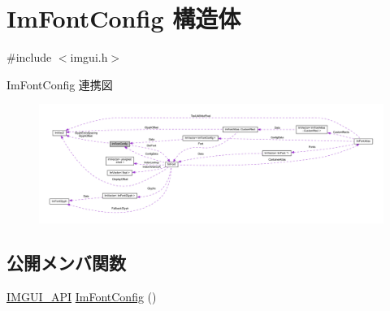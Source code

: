 \hypertarget{struct_im_font_config}{}\section{Im\+Font\+Config 構造体}
\label{struct_im_font_config}


{\ttfamily \#include $<$imgui.\+h$>$}



Im\+Font\+Config 連携図\nopagebreak
\begin{figure}[H]
\begin{center}
\leavevmode
\includegraphics[width=350pt]{struct_im_font_config__coll__graph}
\end{center}
\end{figure}
\subsection*{公開メンバ関数}
\begin{DoxyCompactItemize}
\item 
\mbox{\hyperlink{imgui_8h_a43829975e84e45d1149597467a14bbf5}{I\+M\+G\+U\+I\+\_\+\+A\+PI}} \mbox{\hyperlink{struct_im_font_config_af56ce39ce94ce0fb5171f4d8aa93f79c}{Im\+Font\+Config}} ()
\end{DoxyCompactItemize}

